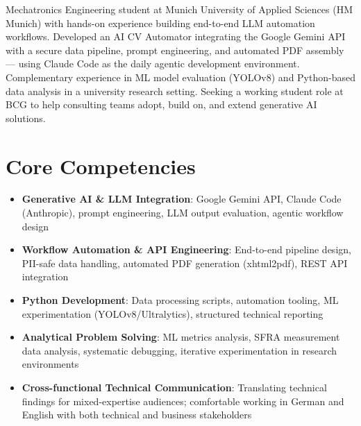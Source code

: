 \documentclass[11pt,a4paper,sans]{moderncv}
\begin{document}
\makecvtitle


\vspace{6pt}
\small{Mechatronics Engineering student at Munich University of Applied Sciences (HM Munich) with hands-on experience building end-to-end LLM automation workflows. Developed an AI CV Automator integrating the Google Gemini API with a secure data pipeline, prompt engineering, and automated PDF assembly --- using Claude Code as the daily agentic development environment. Complementary experience in ML model evaluation (YOLOv8) and Python-based data analysis in a university research setting. Seeking a working student role at BCG to help consulting teams adopt, build on, and extend generative AI solutions.}


\section{Core Competencies}
\vspace{1pt}
\begin{itemize}

\item \textbf{Generative AI \& LLM Integration}: Google Gemini API, Claude Code (Anthropic), prompt engineering, LLM output evaluation, agentic workflow design

\item \textbf{Workflow Automation \& API Engineering}: End-to-end pipeline design, PII-safe data handling, automated PDF generation (xhtml2pdf), REST API integration

\item \textbf{Python Development}: Data processing scripts, automation tooling, ML experimentation (YOLOv8/Ultralytics), structured technical reporting

\item \textbf{Analytical Problem Solving}: ML metrics analysis, SFRA measurement data analysis, systematic debugging, iterative experimentation in research environments

\item \textbf{Cross-functional Technical Communication}: Translating technical findings for mixed-expertise audiences; comfortable working in German and English with both technical and business stakeholders

\end{itemize}
\end{document}
